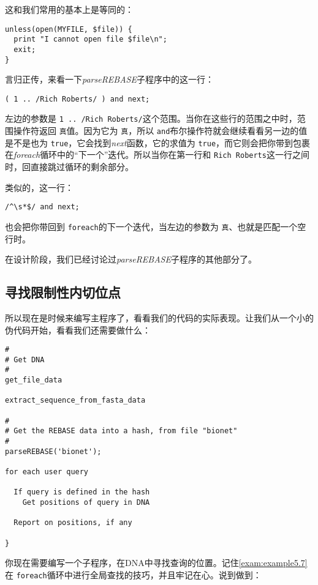 这和我们常用的基本上是等同的：

\begin{lstlisting}
unless(open(MYFILE, $file)) {
  print "I cannot open file $file\n";
  exit;
}
\end{lstlisting}

言归正传，来看一下\textit{parseREBASE}子程序中的这一行：

\begin{lstlisting}
( 1 .. /Rich Roberts/ ) and next;
\end{lstlisting}

左边的参数是 \verb|1 .. /Rich Roberts/|这个范围。当你在这些行的范围之中时，范围操作符返回 \verb|真|值。因为它为 \verb|真|，所以 \verb|and|布尔操作符就会继续看看另一边的值是不是也为 \verb|true|，它会找到\textit{next}函数，它的求值为 \verb|true|，而它则会把你带到包裹在\textit{foreach}循环中的“下一个”迭代。所以当你在第一行和 \verb|Rich Roberts|这一行之间时，回直接跳过循环的剩余部分。

类似的，这一行：

\begin{lstlisting}
/^\s*$/ and next;
\end{lstlisting}

也会把你带回到 \verb|foreach|的下一个迭代，当左边的参数为 \verb|真|、也就是匹配一个空行时。


在设计阶段，我们已经讨论过\textit{parseREBASE}子程序的其他部分了。

\subsection{寻找限制性内切位点}
所以现在是时候来编写主程序了，看看我们的代码的实际表现。让我们从一个小的伪代码开始，看看我们还需要做什么：

\begin{lstlisting}
#
# Get DNA
#
get_file_data

extract_sequence_from_fasta_data

#
# Get the REBASE data into a hash, from file "bionet"
#
parseREBASE('bionet');

for each user query

  If query is defined in the hash
    Get positions of query in DNA

  Report on positions, if any

}
\end{lstlisting}

你现在需要编写一个子程序，在DNA中寻找查询的位置。记住\autoref{exam:example5.7}在 \verb|foreach|循环中进行全局查找的技巧，并且牢记在心。说到做到：

